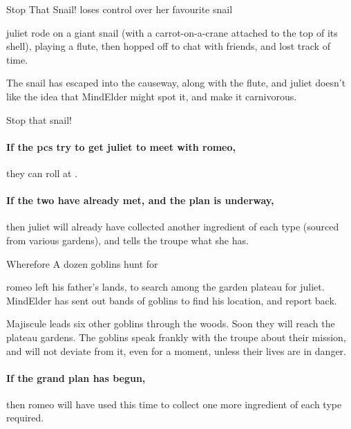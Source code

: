 {Stop That Snail!}%
{ loses control over her favourite snail}%

\Gls{juliet} rode on a giant snail (with a carrot-on-a-crane attached to the top of its shell), playing a flute, then hopped off to chat with friends, and lost track of time.

The snail has escaped into the causeway, along with the flute, and \gls{juliet} doesn't like the idea that \gls{MindElder} might spot it, and make it carnivorous.

\begin{speechtext}
  Stop that snail!
\end{speechtext}

\paragraph{If the \glspl{pc} try to get \gls{juliet} to meet with \gls{romeo},}
they can roll  at \tn[5].

\paragraph{If the two have already met, and the plan is underway,}
then \gls{juliet} will already have collected another \gls{ingredient} of each type (sourced from various gardens), and tells the troupe what she has.

{Wherefore}%
{A dozen goblins hunt for }%

\Gls{romeo} left his father's lands, to search among the garden plateau for \gls{juliet}.
\Gls{MindElder} has sent out bands of goblins to find his location, and report back.

Majiscule leads six other goblins through the woods.
Soon they will reach the plateau gardens.
The goblins speak frankly with the troupe about their mission, and will not deviate from it, even for a moment, unless their lives are in danger.

\paragraph{If the grand plan has begun,}
then \gls{romeo} will have used this time to collect one more \gls{ingredient} of each type required.

